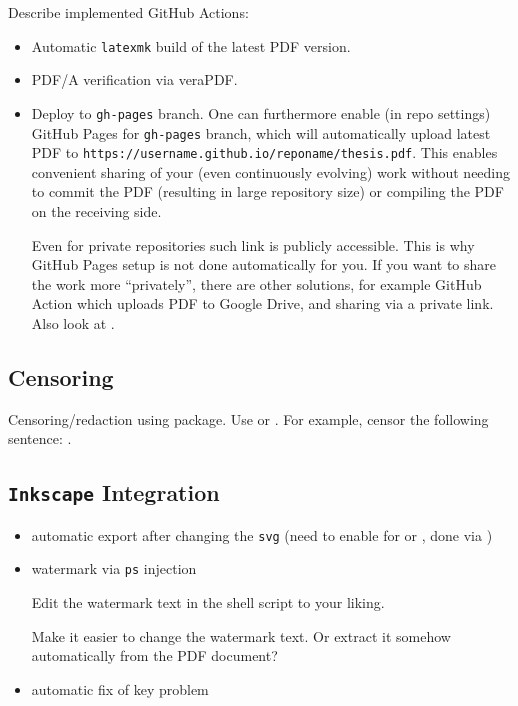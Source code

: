 Describe implemented GitHub Actions:
\begin{itemize}
    \item Automatic \texttt{latexmk} build of the latest PDF version.
    \item PDF/A verification via veraPDF.
    \item Deploy to \texttt{gh-pages} branch.
          One can furthermore enable (in repo settings) GitHub Pages for \texttt{gh-pages} branch, which will automatically upload latest PDF to \texttt{https://username.github.io/reponame/thesis.pdf}.
          This enables convenient sharing of your (even continuously evolving) work without needing to commit the PDF (resulting in large repository size) or compiling the PDF on the receiving side.
          \begin{remark}
              Even for private repositories such link is publicly accessible.
              This is why GitHub Pages setup is not done automatically for you.
              If you want to share the work more \enquote{privately}, there are other solutions, for example GitHub Action which uploads PDF to Google Drive, and sharing via a private link.
              Also look at .
          \end{remark}
\end{itemize}

\subsection{Censoring}%
\label{sub:Censoring}

Censoring/redaction using  package.
Use \macro{\censor} or \macro{\censorbox}.
For example, censor the following sentence: .

\subsection{\texorpdfstring{\texttt{Inkscape}}{Inkscape} Integration}%
\label{sub:Inkscape Integration}

\begin{itemize}
    \item automatic export after changing the \texttt{svg} (need to enable  for  or , done via )
    \item watermark via \texttt{ps} injection
          \begin{remark}
              Edit the watermark text in the shell script  to your liking.
          \end{remark}
          \begin{Todo}
              Make it easier to change the watermark text.
              Or extract it somehow automatically from the PDF document?
          \end{Todo}
    \item automatic fix of  key problem
\end{itemize}


